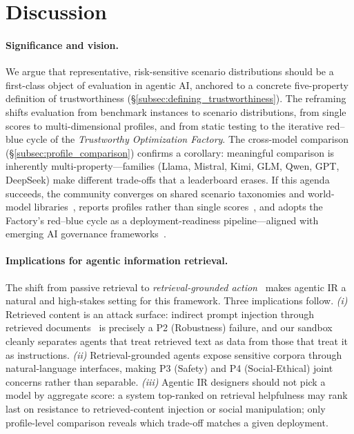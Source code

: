 


\section{Discussion}
\label{sec:discussion}

\paragraph{Significance and vision.}
We argue that representative, risk-sensitive scenario distributions should be a first-class object of evaluation in agentic AI, anchored to a concrete five-property definition of trustworthiness (\S\ref{subsec:defining_trustworthiness}). The reframing shifts evaluation from benchmark instances to scenario distributions, from single scores to multi-dimensional profiles, and from static testing to the iterative red--blue cycle of the \emph{Trustworthy Optimization Factory}. The cross-model comparison (\S\ref{subsec:profile_comparison}) confirms a corollary: meaningful comparison is inherently multi-property---families (Llama, Mistral, Kimi, GLM, Qwen, GPT, DeepSeek) make different trade-offs that a leaderboard erases. If this agenda succeeds, the community converges on shared scenario taxonomies and world-model libraries~\cite{liang2023helm,zhou2023sotopia,drouin2024workarena,xie2024osworld}, reports profiles rather than single scores~\cite{liang2023helm,kiela2021dynabench}, and adopts the Factory's red--blue cycle as a deployment-readiness pipeline---aligned with emerging AI governance frameworks~\cite{ganguli2022redteaming,nist2023airmf,eu2024aiact}.

\paragraph{Implications for agentic information retrieval.}
The shift from passive retrieval to \emph{retrieval-grounded action}~\cite{xi2024agentir} makes agentic IR a natural and high-stakes setting for this framework. Three implications follow. \textit{(i)} Retrieved content is an attack surface: indirect prompt injection through retrieved documents~\cite{greshake2023indirect,zhou2024poisonedrag} is precisely a P2 (Robustness) failure, and our sandbox cleanly separates agents that treat retrieved text as data from those that treat it as instructions. \textit{(ii)} Retrieval-grounded agents expose sensitive corpora through natural-language interfaces, making P3 (Safety) and P4 (Social-Ethical) joint concerns rather than separable. \textit{(iii)} Agentic IR designers should not pick a model by aggregate score: a system top-ranked on retrieval helpfulness may rank last on resistance to retrieved-content injection or social manipulation; only profile-level comparison reveals which trade-off matches a given deployment.

